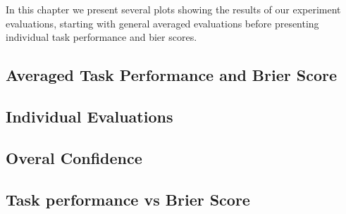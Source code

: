 \documentclass[../main/main.tex]{subfiles}
\begin{document}
In this chapter we present several plots showing the results of our experiment evaluations, starting with general averaged evaluations before presenting individual task performance and bier scores. 
\subsection{Averaged Task Performance and Brier Score}
\subsection{Individual Evaluations}
\subsection{Overal Confidence}
\subsection{Task performance vs Brier Score}
\end{document}
